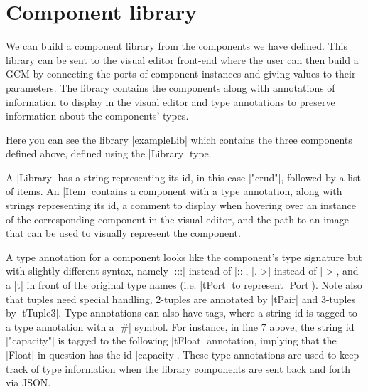 \documentclass[a4paper]{article}
\begin{document}
\section{Component library}
We can build a component library from the components we have defined.
This library can be sent to the visual editor front-end where the user can then
build a GCM by connecting the ports of component instances and giving values to
their parameters. The library contains the components along with annotations of
information to display in the visual editor and type annotations to preserve
information about the components' types.

Here you can see the library |exampleLib| which contains the three components
defined above, defined using the |Library| type.
A |Library| has a string representing its id, in this case |"crud"|, followed by
a list of items. An |Item| contains a component with a type annotation,
along with strings representing its id, a comment to display when hovering over
an instance of the corresponding component in the visual editor, and the path to
an image that can be used to visually represent the component. 

A type annotation for a component looks like the component's type signature
but with slightly different syntax, namely |:::| instead of |::|, |.->| instead
of |->|, and a |t| in front of the original type names (i.e. |tPort| to
represent |Port|). Note also that tuples need special handling, 2-tuples are
annotated by |tPair| and 3-tuples by |tTuple3|. Type annotations can also have
tags, where a string id is tagged to a type annotation with a |#| symbol. For
instance, in line 7 above, the string id |"capacity"| is tagged to the following
|tFloat| annotation, implying that the |Float| in question has the id
|capacity|. These type annotations are used to keep track of type information
when the library components are sent back and forth via JSON.
\end{document}
